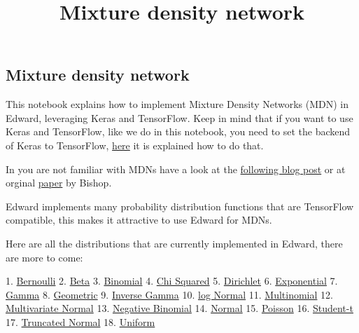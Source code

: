 \title{Mixture density network}

\subsection{Mixture density network}

This notebook explains how to implement Mixture Density Networks (MDN) in Edward, leveraging Keras and TensorFlow.
Keep in mind that if you want to use Keras and TensorFlow, like we do in this notebook, you need to set the backend of Keras to TensorFlow,
\href{http://keras.io/backend/}{here} it is explained how to do that.

In you are not familiar with MDNs have a look at the
\href{http://cbonnett.github.io/MDN.html)}{following blog post} or at
orginal
\href{http://research.microsoft.com/en-us/um/people/cmbishop/downloads/Bishop-NCRG-94-004.pdf}{paper}
by Bishop.

Edward implements many probability distribution functions that are TensorFlow compatible, this makes it attractive to use Edward for MDNs.

Here are all the distributions that are currently implemented in Edward, there are more to come:

1. \href{https://github.com/blei-lab/edward/blob/master/edward/stats/distributions.py#L49}{Bernoulli}
2. \href{https://github.com/blei-lab/edward/blob/master/edward/stats/distributions.py#L58}{Beta}
3. \href{https://github.com/blei-lab/edward/blob/master/edward/stats/distributions.py#L68}{Binomial}
4. \href{https://github.com/blei-lab/edward/blob/master/edward/stats/distributions.py#L79}{Chi Squared}
5. \href{https://github.com/blei-lab/edward/blob/master/edward/stats/distributions.py#L89}{Dirichlet}
6. \href{https://github.com/blei-lab/edward/blob/master/edward/stats/distributions.py#L109}{Exponential}
7. \href{https://github.com/blei-lab/edward/blob/master/edward/stats/distributions.py#L118}{Gamma}
8. \href{https://github.com/blei-lab/edward/blob/master/edward/stats/distributions.py#L129}{Geometric}
9. \href{https://github.com/blei-lab/edward/blob/master/edward/stats/distributions.py#L138}{Inverse Gamma}
10. \href{https://github.com/blei-lab/edward/blob/master/edward/stats/distributions.py#L155}{log Normal}
11. \href{https://github.com/blei-lab/edward/blob/master/edward/stats/distributions.py#L165}{Multinomial}
12. \href{https://github.com/blei-lab/edward/blob/master/edward/stats/distributions.py#L194}{Multivariate Normal}
13. \href{https://github.com/blei-lab/edward/blob/master/edward/stats/distributions.py#L283}{Negative Binomial}
14. \href{https://github.com/blei-lab/edward/blob/master/edward/stats/distributions.py#L294}{Normal}
15. \href{https://github.com/blei-lab/edward/blob/master/edward/stats/distributions.py#L310}{Poisson}
16. \href{https://github.com/blei-lab/edward/blob/master/edward/stats/distributions.py#L319}{Student-t}
17. \href{https://github.com/blei-lab/edward/blob/master/edward/stats/distributions.py#L333}{Truncated Normal}
18. \href{https://github.com/blei-lab/edward/blob/master/edward/stats/distributions.py#L352}{Uniform}

